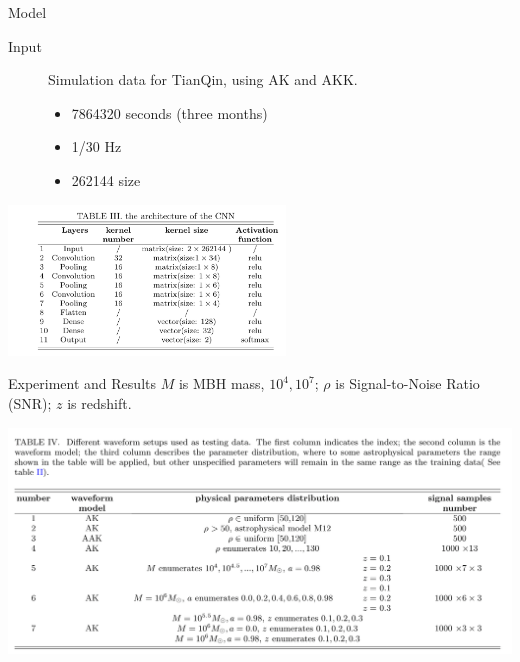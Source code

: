 \documentclass[aspectratio=1610,xcolor={dvipsnames},hyperref={colorlinks,unicode,linkcolor=violet,anchorcolor=blueviolet,citecolor=YellowOrange,filecolor=black,urlcolor=Aquamarine}]{beamer}
\begin{document}
\begin{frame}[label={sec:org662735a}]{Model}
\begin{description}
\item[{Input}] Simulation data for TianQin, using AK and AKK.
\begin{itemize}
\item 7864320 seconds (three months)
\item 1/30 Hz
\item 262144 size
\end{itemize}
\end{description}

\begin{center}
\includegraphics[height=4cm]{./p4.png}
\end{center}
\end{frame}

\begin{frame}[label={sec:org9e4b260}]{Experiment and Results}
\(M\) is MBH mass, \(10^4, 10^7\);  \(\rho\) is Signal-to-Noise Ratio
(SNR); \(z\) is redshift.

\begin{center}
\includegraphics[height=6cm]{./p6.png}
\end{center}
\end{frame}
\end{document}
